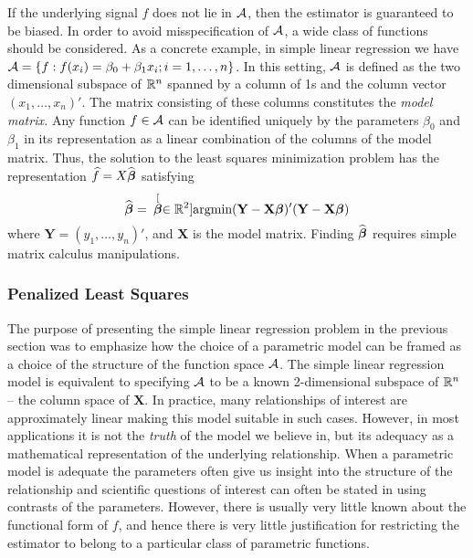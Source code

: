 If the underlying signal $f$ does not lie in $\mathcal{A}$, then the estimator is guaranteed to be biased. In order to avoid misspecification of $\mathcal{A}$, a wide class of functions should be considered.  As a concrete example, in simple linear regression we have $\mathcal{A} = \{f: f(x_i) = \beta_0 + \beta_1x_i ; i=1,\dots,n \}$. In this setting, $\mathcal{A}$ is defined as the two dimensional subspace of $ \mathbb{R} ^n$ spanned by a column of 1s and the column vector $(x_1,\dots, x_n)'$. The matrix consisting of these columns constitutes the \textit{model matrix.} Any function $f \in \mathcal{A}$ can be identified uniquely by the parameters $\beta_0$ and $\beta_1$ in its representation as a linear combination of the columns of the model matrix. Thus, the solution to the least squares minimization problem has the representation $\widehat{f} = X\widehat{\boldsymbol\beta}$ satisfying 
\begin{equation*}
\widehat{\boldsymbol\beta} =  \hspace{.07in}  \stackrel[{\boldsymbol\beta} \in  \mathbb{R} ^2]{}{\mbox{argmin}} (\textbf{Y} - \textbf{X}\boldsymbol\beta)'(\textbf{Y} - \textbf{X}\boldsymbol\beta)
\label{eq:LS2}
\end{equation*}
where $\textbf{Y}=(y_1,\dots, y_n)'$, and $\textbf{X}$ is the model matrix. Finding $\widehat{\boldsymbol\beta}$ requires simple matrix calculus manipulations. 

\subsubsection{Penalized Least Squares} \label{PLS}
  The purpose of presenting the simple linear regression problem in the previous section was to emphasize how the choice of a parametric model can be framed as a choice of the structure of the function space $\mathcal{A}$. The simple linear regression model is equivalent to specifying $\mathcal{A}$ to be a known 2-dimensional subspace of $ \mathbb{R} ^n$ -- the column space of $\textbf{X}$. In practice, many relationships of interest are approximately linear making this model suitable in such cases. However, in most applications it is not the \textit{truth} of the model we believe in, but its adequacy as a mathematical representation of the underlying relationship. When a parametric model is adequate the parameters often give us insight into the structure of the relationship and scientific questions of interest can often be stated in using contrasts of the parameters. However, there is usually very little known about the functional form of $f$, and hence there is very little justification for restricting the estimator to belong to a particular class of parametric functions. 
 
